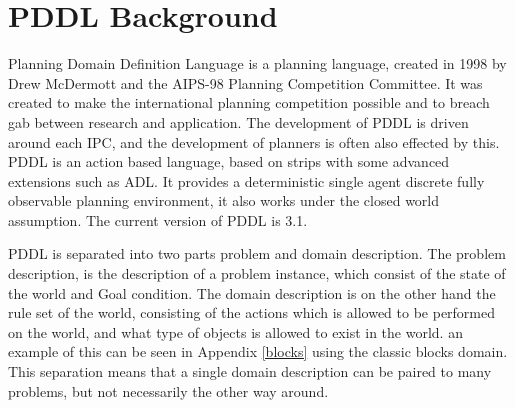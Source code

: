 \section{PDDL \textbf{Background}}
Planning Domain Definition Language is a planning language, created in 1998 by Drew McDermott and the AIPS-98 Planning Competition Committee. It was created to make the international planning competition possible and to breach gab between research and application. The development of PDDL is driven around each IPC, and the  development of planners is often also effected by this.
PDDL is an action based language, based on strips with some advanced extensions such as ADL. It provides a deterministic single agent discrete fully observable planning environment, it also works under the closed world assumption. The current version of PDDL is 3.1.

PDDL is separated into two parts problem and domain description. The problem description, is the description of a problem instance, which consist of the state of the world and Goal condition. The domain description is on the other hand the rule set of the world, consisting of the actions which is allowed to be performed on the world, and what type of objects is allowed to exist in the world. an example of this can be seen in Appendix \ref{blocks} using the classic blocks domain. This separation means that a single domain description can be paired to many problems, but not necessarily the other way around.

